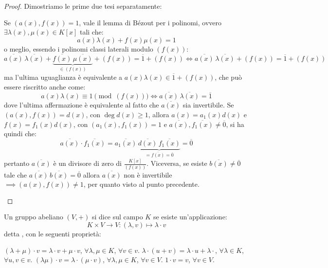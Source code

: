 \documentclass[11pt]{scrartcl}
\begin{document}
\begin{proof}
Dimostriamo le prime due tesi separatamente:
	\begin{enumerate}[(1)]
	\ii Se $(a(x),f(x)) = 1$, vale il lemma di Bézout per i polinomi, ovvero $\exists \lambda(x), \mu(x) \in K[x]$ tali che:
		\[ 	a(x)\lambda(x) + f(x)\mu(x) = 1
		\]
o meglio, essendo i polinomi classi laterali modulo $(f(x))$:
		\[ \overline{a(x)}\,\overline{\lambda(x)} + \underbrace{\overline{f(x)}\,\overline{\mu(x)}}_{\in (f(x))} + (f(x)) = \overline 1 + (f(x)) \iff \overline{a(x)}\,\overline{\lambda(x)} + (f(x)) = \overline 1 + (f(x))
		\]
ma l'ultima uguaglianza è equivalente a $a(x)\lambda(x) \in \overline 1 + (f(x))$, che può essere riscritto anche come:
		\[ a(x)\lambda(x) \equiv 1 \pmod{(f(x))} \iff \overline{a(x)}\, \overline{\lambda(x)} = \overline 1
		\]
dove l'ultima affermazione è equivalente al fatto che $\overline{a(x)}$ sia invertibile.
	\ii Se $(a(x),f(x)) = d(x)$, con $\deg d(x) \geq 1$, allora $a(x)=a_1(x)d(x)$ e $f(x)=f_1(x)d(x)$, con $(a_1(x),f_1(x))=1$ e $\overline{a(x)},\overline{f_1(x)} \ne \overline 0$, si ha quindi che:
		\[ \overline{a(x)}\cdot\overline{f_1(x)} =  \overline{a_1(x)}\,\underbrace{\overline{d(x)}\, \overline{f_1(x)}}_{= \overline{f(x)} = \overline 0} = \overline 0
		\]
		pertanto $\overline{a(x)}$ è un divisore di zero di $\frac{K[x]}{(f(x))}$. Viceversa, se esiste $\overline{b(x)} \ne \overline 0$ tale che $\overline{a(x)}\,\overline{b(x)} = \overline 0$
		allora $\overline{a(x)}$ non è invertibile $\implies (a(x),f(x)) \ne 1$, per quanto visto al punto precedente.
	\end{enumerate}
\end{proof}

\begin{remark}
Un gruppo abeliano $(V,+)$ si dice  sul campo $K$ se esiste un'applicazione:
	\[ K \times V \longrightarrow V : (\lambda,v) \longmapsto \lambda \cdot v
		\]
detta , con le seguenti proprietà:
	\begin{enumerate}[(i)]
		\ii $(\lambda + \mu)\cdot v = \lambda\cdot v + \mu \cdot v$, $\forall \lambda,\mu \in K$, $\forall v \in v$.
		\ii $\lambda \cdot (u + v) = \lambda \cdot u + \lambda \cdot$, $\forall \lambda \in K$, $\forall u,v \in v$.
		\ii $(\lambda\mu)\cdot v  = \lambda\cdot(\mu\cdot v)$, $\forall \lambda,\mu \in K$, $\forall v \in V$.
		\ii $1 \cdot v = v$, $\forall v \in V$.
	\end{enumerate}
\end{remark}
\end{document}
